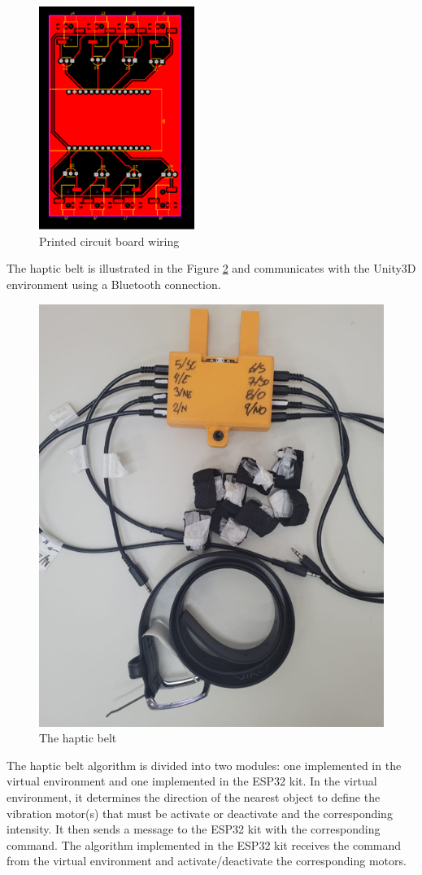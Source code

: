         \begin{figure}[htbp]
            \centering
            \includegraphics[width=0.45\textwidth, angle = 90, origin = c]{Metodologia/PCB Cinto.pdf}
            \caption{Printed circuit board wiring}
            \label{fig:pcb_wiring}
        \end{figure}

        The haptic belt is illustrated in the Figure \ref{fig:cinto_haptico} and communicates with the Unity3D environment using a Bluetooth connection.

        \begin{figure}[!htb]
            \centering
            \includegraphics[width = 0.5\linewidth]{Metodologia/Cinto Haptico.png}
            \caption{The haptic belt}
            \label{fig:cinto_haptico}
        \end{figure}

        The haptic belt algorithm is divided into two modules: one implemented in the virtual environment and one implemented in the ESP32 kit. In the virtual environment, it determines the direction of the nearest object to define the vibration motor(s) that must be activate or deactivate and the corresponding intensity. It then sends a message to the ESP32 kit with the corresponding command. The algorithm implemented in the ESP32 kit receives the command from the virtual environment and activate/deactivate the corresponding motors.

